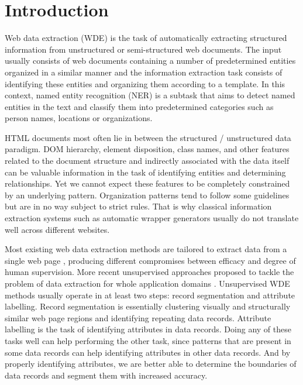 \documentclass[sigconf]{acmart}
\begin{document}
\section{Introduction}

Web data extraction (WDE) is the task of automatically extracting structured information
from unstructured or semi-structured web documents. The input usually consists of
web documents containing a number of predetermined entities organized in a similar 
manner and the information extraction task consists of identifying these entities
and organizing them according to a template. In this context, named entity recognition
(NER) is a subtask that aims to detect named entities in the text and classify them into 
predetermined categories such as person names, locations or organizations. 

HTML documents most often lie in between the structured / unstructured data paradigm.
DOM hierarchy, element disposition, class names, and other features related to 
the document structure and indirectly associated with the data itself can be valuable 
information in the task of identifying entities and determining relationships. Yet we 
cannot expect these features to be completely constrained by an underlying pattern. 
Organization patterns tend to follow some guidelines but are in no way subject to 
strict rules. That is why classical information extraction systems such as automatic
wrapper generators usually do not translate well across different websites. 

Most existing web data extraction methods are tailored to extract data from a single
web page \cite{Crescenzi2001, Arasu2003, Freitag1998, Califf1999, Soderland1999,
Kushmerick2000, Hsu1998, Muslea1999}, producing different compromises between efficacy
and degree of human supervision. More recent unsupervised approaches proposed to
tackle the problem of data extraction for whole application domains \cite{Zhu2005, Zhu2006, 
Abdessalem2010, Furche2012, Furche2012a}. Unsupervised WDE methods usually operate in at
least two steps: record segmentation and attribute labelling. Record segmentation
is essentially clustering visually and structurally similar web page regions and 
identifying repeating data records. Attribute labelling is the task of identifying
attributes in data records. Doing any of these tasks well can help performing the 
other task, since patterns that are present in some data records can help identifying 
attributes in other data records. And by properly identifying attributes, we are better 
able to determine the boundaries of data records and segment them with increased accuracy.
\end{document}
